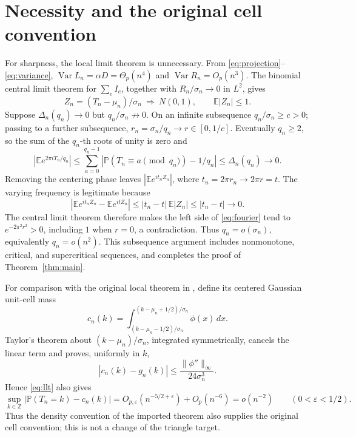 \documentclass[11pt]{article}
\newcommand{\Pp}{\mathbb P}
\newcommand{\Ee}{\mathbb E}
\newcommand{\Var}{\operatorname{Var}}
\newcommand{\Z}{\mathbb Z}
\begin{document}
\section{Necessity and the original cell convention}

For sharpness, the local limit theorem is unnecessary. From
\eqref{eq:projection}--\eqref{eq:variance},
\(\Var L_n=\alpha D=\Theta_p(n^4)\) and \(\Var R_n=O_p(n^3)\).
The binomial central limit theorem for \(\sum_e I_e\), together with
\(R_n/\sigma_n\to0\) in \(L^2\), gives
\[
 Z_n=(T_n-\mu_n)/\sigma_n\ \Longrightarrow\ N(0,1),
 \qquad \Ee|Z_n|\leq1 .
\]
Suppose \(\Delta_n(q_n)\to0\) but \(q_n/\sigma_n\not\to0\).
On an infinite subsequence \(q_n/\sigma_n\geq c>0\); passing to a further
subsequence, \(r_n=\sigma_n/q_n\to r\in[0,1/c]\).
Eventually \(q_n\geq2\), so the sum of the \(q_n\)-th roots of unity is zero
and
\begin{equation}\label{eq:fourier}
 \left|\Ee e^{2\pi iT_n/q_n}\right|
 \leq\sum_{a=0}^{q_n-1}
       \left|\Pp(T_n\equiv a\pmod {q_n})-1/q_n\right|
 \leq\Delta_n(q_n)\longrightarrow0 .
\end{equation}
Removing the centering phase leaves
\(\left|\Ee e^{it_nZ_n}\right|\), where \(t_n=2\pi r_n\to2\pi r=t\).
The varying frequency is legitimate because
\[
 \left|\Ee e^{it_nZ_n}-\Ee e^{itZ_n}\right|
       \leq |t_n-t|\,\Ee|Z_n|\leq|t_n-t|\longrightarrow0 .
\]
The central limit theorem therefore makes the left side of
\eqref{eq:fourier} tend to \(e^{-2\pi^2r^2}>0\), including \(1\) when
\(r=0\), a contradiction. Thus \(q_n=o(\sigma_n)\), equivalently
\(q_n=o(n^2)\). This subsequence argument includes nonmonotone, critical,
and supercritical sequences, and completes the proof of
Theorem~\ref{thm:main}.

For comparison with the original local theorem in \cite{ST}, define its
centered Gaussian unit-cell mass
\[
 c_n(k)=
 \int_{(k-\mu_n-1/2)/\sigma_n}^{(k-\mu_n+1/2)/\sigma_n}\phi(x)\,dx .
\]
Taylor's theorem about \((k-\mu_n)/\sigma_n\), integrated symmetrically,
cancels the linear term and proves, uniformly in \(k\),
\[
 |c_n(k)-g_n(k)|\leq\frac{\|\phi''\|_\infty}{24\sigma_n^3}.
\]
Hence \eqref{eq:llt} also gives
\[
 \sup_{k\in\Z}|\Pp(T_n=k)-c_n(k)|
 =O_{p,\varepsilon}(n^{-5/2+\varepsilon})+O_p(n^{-6})
 =o(n^{-2})\qquad(0<\varepsilon<1/2).
\]
Thus the density convention of the imported theorem also supplies the
original cell convention; this is not a change of the triangle target.
\end{document}
